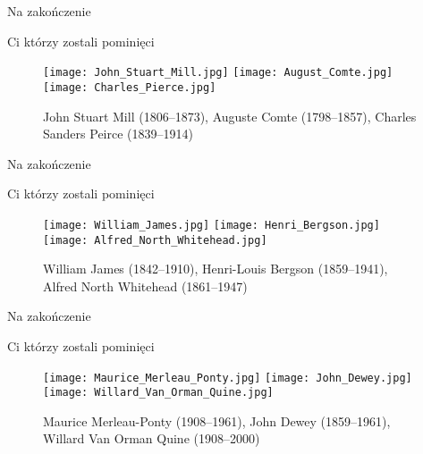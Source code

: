 \documentclass{beamer}  %
\begin{document}
\begin{frame}{Na zakończenie}

  \begin{block}{Ci którzy zostali pominięci}
    \begin{figure}
      \centering

      \texttt{[image: John\_Stuart\_Mill.jpg]}
      \texttt{[image: August\_Comte.jpg]}
      \texttt{[image: Charles\_Pierce.jpg]}
      \caption{John Stuart Mill (1806--1873), Auguste Comte
        (1798--1857), Charles Sanders Peirce (1839--1914)}
    \end{figure}
  \end{block}

\end{frame}



\begin{frame}{Na zakończenie}

  \begin{block}{Ci którzy zostali pominięci}
    \begin{figure}
      \centering

      \texttt{[image: William\_James.jpg]}
      \texttt{[image: Henri\_Bergson.jpg]}
      \texttt{[image: Alfred\_North\_Whitehead.jpg]}
      \caption{William James (1842--1910), Henri-Louis Bergson
        (1859--1941), Alfred North Whitehead (1861--1947)}
    \end{figure}
  \end{block}

\end{frame}



\begin{frame}{Na zakończenie}
  \begin{block}{Ci którzy zostali pominięci}
    \begin{figure}
      \centering

      \texttt{[image: Maurice\_Merleau\_Ponty.jpg]}
      \texttt{[image: John\_Dewey.jpg]}
      \texttt{[image: Willard\_Van\_Orman\_Quine.jpg]}
      \caption{Maurice Merleau-Ponty (1908--1961), John Dewey
        (1859--1961), Willard Van Orman Quine (1908--2000)}
    \end{figure}
  \end{block}

\end{frame}
\end{document}
